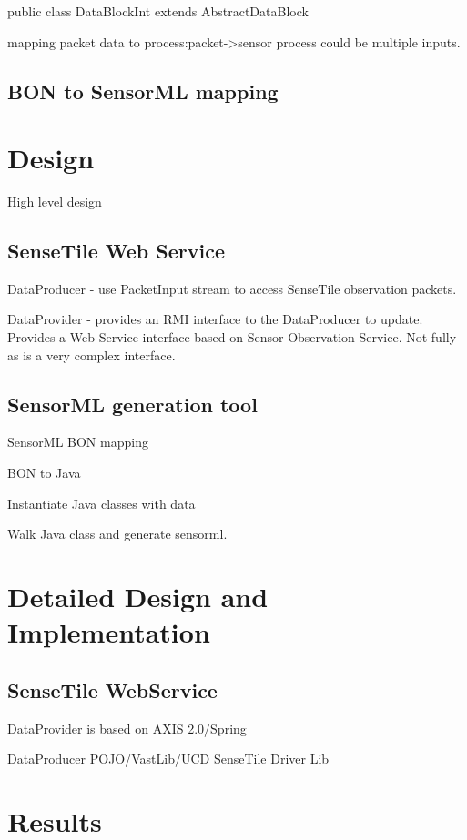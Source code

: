 \documentclass[]{final_report}
\begin{document}
public class DataBlockInt extends AbstractDataBlock


mapping packet data to process:packet->sensor process
could be multiple inputs.

\section{BON to SensorML mapping}

\chapter{Design}
High level design
\section{SenseTile Web Service}

DataProducer - use PacketInput stream to access SenseTile observation packets.

DataProvider - provides an RMI interface to the DataProducer to update. Provides a Web Service interface  based on Sensor Observation Service. Not fully as is a very complex interface.

\section{SensorML generation tool}

SensorML BON mapping

BON to Java

Instantiate Java classes with data

Walk Java class and generate sensorml.



\chapter{ Detailed Design and Implementation}

\section{SenseTile WebService}

DataProvider is based on AXIS 2.0/Spring

DataProducer POJO/VastLib/UCD SenseTile Driver Lib

\chapter{Results}
\end{document}
